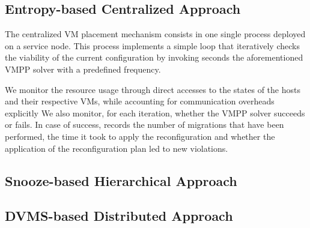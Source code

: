 \subsection{Entropy-based Centralized Approach}
\label{subsec:entropy}
The centralized VM placement mechanism consists in one single \sg
process deployed on a service node. This process implements a simple loop that
iteratively checks the viability of the current configuration by
invoking seconds the aforementioned VMPP solver with a predefined
frequency.


We monitor the resource usage through direct accesses
to the states of the hosts and their respective VMs, while accounting
for communication overheads explicitly
%
%
We also monitor, for each iteration, whether the VMPP solver succeeds
or fails. In case of success, \vmps records the number of migrations
that have been performed, the time it took to apply the
reconfiguration and whether the application of the reconfiguration
plan led to new violations.

\subsection{Snooze-based Hierarchical Approach}
\label{subsec:snooze}


\subsection{DVMS-based Distributed Approach}
\label{subsec:dvms}




